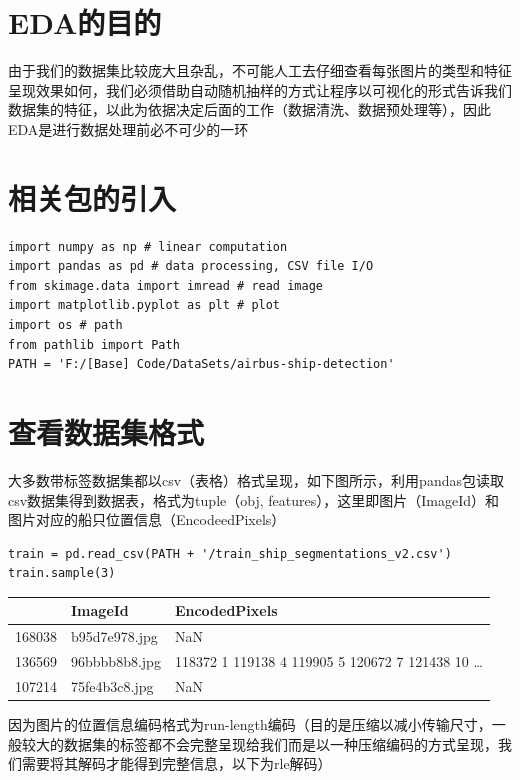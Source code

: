 \section{EDA的目的}\label{edaux7684ux76eeux7684}

由于我们的数据集比较庞大且杂乱，不可能人工去仔细查看每张图片的类型和特征呈现效果如何，我们必须借助自动随机抽样的方式让程序以可视化的形式告诉我们数据集的特征，以此为依据决定后面的工作（数据清洗、数据预处理等），因此EDA是进行数据处理前必不可少的一环

\section{相关包的引入}\label{ux76f8ux5173ux5305ux7684ux5f15ux5165}

\begin{lstlisting}
import numpy as np # linear computation
import pandas as pd # data processing, CSV file I/O
from skimage.data import imread # read image
import matplotlib.pyplot as plt # plot
import os # path
from pathlib import Path
PATH = 'F:/[Base] Code/DataSets/airbus-ship-detection'
\end{lstlisting}

\section{查看数据集格式}\label{ux67e5ux770bux6570ux636eux96c6ux683cux5f0f}

大多数带标签数据集都以csv（表格）格式呈现，如下图所示，利用pandas包读取csv数据集得到数据表，格式为tuple（obj,
features），这里即图片（ImageId）和图片对应的船只位置信息（EncodeedPixels）

\begin{lstlisting}
train = pd.read_csv(PATH + '/train_ship_segmentations_v2.csv')
train.sample(3)
\end{lstlisting}

\begin{longtable}[]{@{}lll@{}}
\toprule
& ImageId & EncodedPixels\tabularnewline
\midrule
\endhead
168038 & b95d7e978.jpg & NaN\tabularnewline
136569 & 96bbbb8b8.jpg & 118372 1 119138 4 119905 5 120672 7 121438 10
\ldots{}\tabularnewline
107214 & 75fe4b3c8.jpg & NaN\tabularnewline
\bottomrule
\end{longtable}

因为图片的位置信息编码格式为run-length编码（目的是压缩以减小传输尺寸，一般较大的数据集的标签都不会完整呈现给我们而是以一种压缩编码的方式呈现，我们需要将其解码才能得到完整信息，以下为rle解码）

